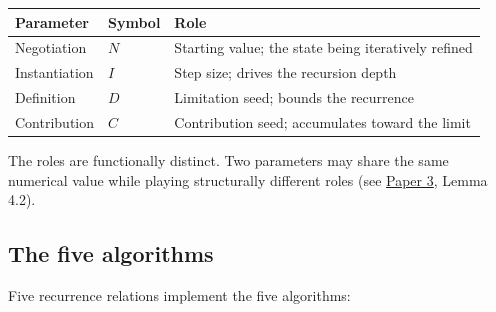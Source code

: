 \documentclass[12pt]{article}
\begin{document}
\begin{longtable}[]{@{}
  >{\raggedright\arraybackslash}p{}
  >{\raggedright\arraybackslash}p{}
  >{\raggedright\arraybackslash}p{}@{}}
\toprule\noalign{}
\begin{minipage}[b]{\linewidth}\raggedright
Parameter
\end{minipage} & \begin{minipage}[b]{\linewidth}\raggedright
Symbol
\end{minipage} & \begin{minipage}[b]{\linewidth}\raggedright
Role
\end{minipage} \\
\midrule\noalign{}
\endhead
\bottomrule\noalign{}
\endlastfoot
Negotiation & \(N\) & Starting value; the state being iteratively
refined \\
Instantiation & \(I\) & Step size; drives the recursion depth \\
Definition & \(D\) & Limitation seed; bounds the recurrence \\
Contribution & \(C\) & Contribution seed; accumulates toward the
limit \\
\end{longtable}

The roles are functionally distinct. Two parameters may share the same
numerical value while playing structurally different roles (see
\href{https://github.com/baardev/truevalue/blob/main/docnav/Research/papers/3_minimal-recursive-triadic-framework/3_minimal-recursive-triadic-framework.pdf}{Paper
3}, Lemma 4.2).

\subsection{The five algorithms}\label{the-five-algorithms}

Five recurrence relations implement the five algorithms:
\end{document}
